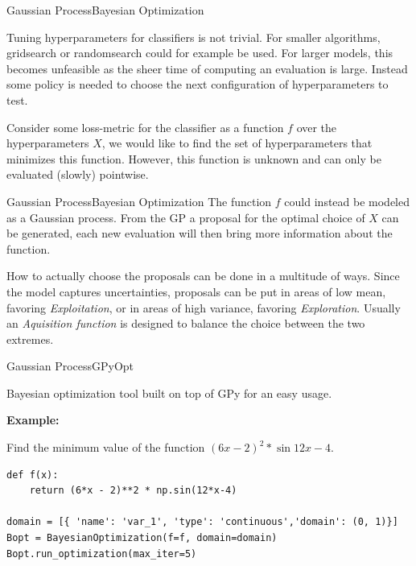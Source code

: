 \documentclass{beamer}
\begin{document}
\begin{frame}{Gaussian Process}{Bayesian Optimization}

Tuning hyperparameters for classifiers is not trivial. For smaller algorithms, gridsearch or randomsearch could for example be used. For larger models, this becomes unfeasible as the sheer time of computing an evaluation is large. Instead some policy is needed to choose the next configuration of hyperparameters to test. \linebreak 

Consider some loss-metric for the classifier as a function $f$ over the hyperparameters $X$, we would like to find the set of hyperparameters that minimizes this function. However, this function is unknown and can only be evaluated (slowly) pointwise. 

\end{frame}

\begin{frame}{Gaussian Process}{Bayesian Optimization}
The function $f$ could instead be modeled as a Gaussian process. From the GP a proposal for the optimal choice of $X$ can be generated, each new evaluation will then bring more information about the function. \linebreak

How to actually choose the proposals can be done in a multitude of ways. Since the model captures uncertainties, proposals can be put in areas of low mean, favoring \emph{Exploitation}, or in areas of high variance, favoring \emph{Exploration}. Usually an \emph{Aquisition function} is designed to balance the choice between the two extremes.
\end{frame}

\begin{frame}[fragile]{Gaussian Process}{GPyOpt}
	
Bayesian optimization tool built on top of GPy for an easy usage. \linebreak

\textbf{Example:}

Find the minimum value of the function $(6x-2)^2*\sin{12x-4}$.


\begin{Verbatim}[fontsize=\footnotesize]
def f(x):
	return (6*x - 2)**2 * np.sin(12*x-4) 

domain = [{ 'name': 'var_1', 'type': 'continuous','domain': (0, 1)}]
Bopt = BayesianOptimization(f=f, domain=domain)
Bopt.run_optimization(max_iter=5)
\end{Verbatim}


\end{frame}
\end{document}
